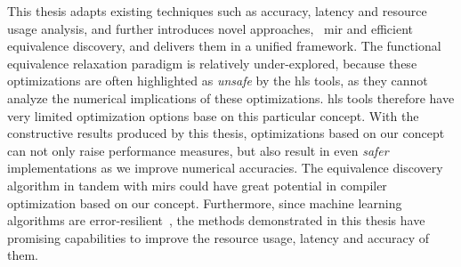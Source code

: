 This thesis adapts existing techniques such as accuracy, latency and resource
usage analysis, and further introduces novel approaches, \eg~\gls{mir} and
efficient equivalence discovery, and delivers them in a unified framework.
The functional equivalence relaxation paradigm is relatively under-explored,
because these optimizations are often highlighted as \emph{unsafe} by the
\gls{hls} tools, as they cannot analyze the numerical implications of these
optimizations.  \Gls{hls} tools therefore have very limited optimization
options base on this particular concept.  With the constructive results
produced by this thesis, optimizations based on our concept can not only raise
performance measures, but also result in even \emph{safer} implementations
as we improve numerical accuracies.  The equivalence discovery algorithm in
tandem with \glspl{mir} could have great potential in compiler optimization
based on our concept.  Furthermore, since machine learning algorithms are
error-resilient~\cite{lesser11, kim09, holt91, zhu03}, the methods demonstrated
in this thesis have promising capabilities to improve the resource usage,
latency and accuracy of them.
